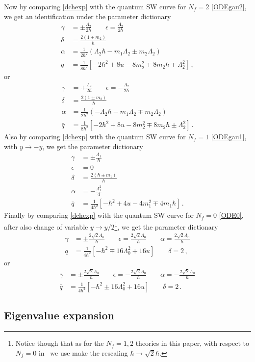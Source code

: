 \documentclass[11pt,a4paper]{elsarticle}
\def \L {\Lambda}
\def \ba {\begin{aligned}}
\def \ea {\end{aligned}}
\newcommand{\be}{\begin{equation}}
\newcommand{\ee}{\end{equation}}
\def \L {\Lambda}
\numberwithin{figure}{section}
\numberwithin{table}{section}
\begin{document}
Now by comparing \eqref{dchexp} with the quantum SW curve for $N_f=2$ \eqref{ODEgau2}, we get an identification under the parameter dictionary
\be 
\ba 
\gamma &= \pm \frac{\L_2}{2\hbar} \qquad \epsilon=  \frac{\L_2}{2\hbar} \\
\delta &= \frac{2(1\pm m_2)}{\hbar} \\
\alpha &=\frac{1}{2\hbar^2}(\L_2\hbar-m_1 \L_2\pm m_2 \L_2) \\
\bar{q}&= \frac{1}{8\hbar^2}[-2 \hbar^2+ 8 u -8 m_2^2 \mp  8 m_2 \hbar \mp \L_2^2]\,,
\ea 
\ee 
or
\be 
\ba 
\gamma &= \pm \frac{\L_2}{2\hbar} \qquad \epsilon=  -\frac{\L_2}{2\hbar} \\
\delta &= \frac{2(1\pm m_2)}{\hbar} \\
\alpha &=\frac{1}{2\hbar^2}(-\L_2\hbar-m_1 \L_2\mp m_2 \L_2) \\
\bar{q}&= \frac{1}{8\hbar^2}[-2 \hbar^2+ 8 u -8 m_2^2 \mp  8 m_2 \hbar \pm \L_2^2]\,.
\ea 
\ee 
Also by comparing \eqref{dchexp} with the quantum SW curve for $N_f=1$ \eqref{ODEgau1}, with $y \to - y$, we get the parameter dictionary
\be 
\ba 
\gamma &=\pm \frac{\L_1}{\hbar}\\
\epsilon &= 0\\
\delta &=\frac{2 (\hbar\pm m_1)}{\hbar} \\
\alpha &= - \frac{\L_1^2}{4}\\
\bar{q} &= \frac{1}{4\hbar^2}[-\hbar^2+4 u -4 m_1^2\mp 4 m_1 \hbar]\,.
\ea 
\ee 
Finally by comparing \eqref{dchexp} with the quantum SW curve for $N_f=0$ \eqref{ODE0}, after also change of variable $y \to y/2$\footnote{Notice though that as for the $N_f=1,2$ theories in this paper, with respect to $N_f=0$ in~\cite{FioravantiGregori:2019} we use make the rescaling $\hbar \to \sqrt{2}\hbar$.},
we get the parameter dictionary
\be 
\ba 
\gamma &= \pm\frac{2\sqrt{2}\L_0}{\hbar}\qquad \epsilon=\frac{2\sqrt{2}\L_0}{\hbar}\qquad \alpha= \frac{2\sqrt{2}\L_0}{\hbar}\\q &= \frac{1}{4\hbar^2} [-\hbar^2\mp16\L_0^2 + 16u]\qquad \delta =2\,,
\ea 
\ee 
or
\be 
\ba 
\gamma &= \pm\frac{2\sqrt{2}\L_0}{\hbar}\qquad \epsilon=-\frac{2\sqrt{2}\L_0}{\hbar}\qquad
\alpha= -\frac{2\sqrt{2}\L_0}{\hbar} \\
\bar{q} &= \frac{1}{4\hbar^2} [-\hbar^2\pm16\L_0^2 + 16u]\qquad \delta = 2\,.
\ea 
\ee 


\subsection{Eigenvalue expansion}
\end{document}
